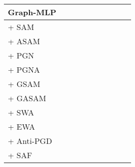 \documentclass[runningheads]{llncs}
\newcommand{\GraphMLP}{Graph-MLP\xspace}
\begin{document}
\begin{table*}[!ht]
\begin{tabular}{l|r r | r r | r r | r | r | r }
\hline
\midrule
  \GraphMLP &  &  &  &  &  &  &  &  & \\ \hline
 + SAM &  &  &  &  &  &  &  &  & \\
 + ASAM &  &  &  &  &  &  &  &  & \\
 + PGN &  &  &  &  &  &  &  &  & \\
 + PGNA &  &  &  &  &  &  &  &  & \\
 + GSAM &  &  &  &  &  &  &  &  & \\
 + GASAM &  &  &  &  &  &  &  &  & \\ \hline
 + SWA &  &  &  &  &  &  &  &  & \\
 + EWA &  &  &  &  &  &  &  &  & \\ \hline
 + Anti-PGD &  &  &  &  &  &  &  &  & \\
 + SAF &  &  &  &  &  &  &  &  & \\

   \bottomrule
    \end{tabular}
\end{table*}
\end{document}
